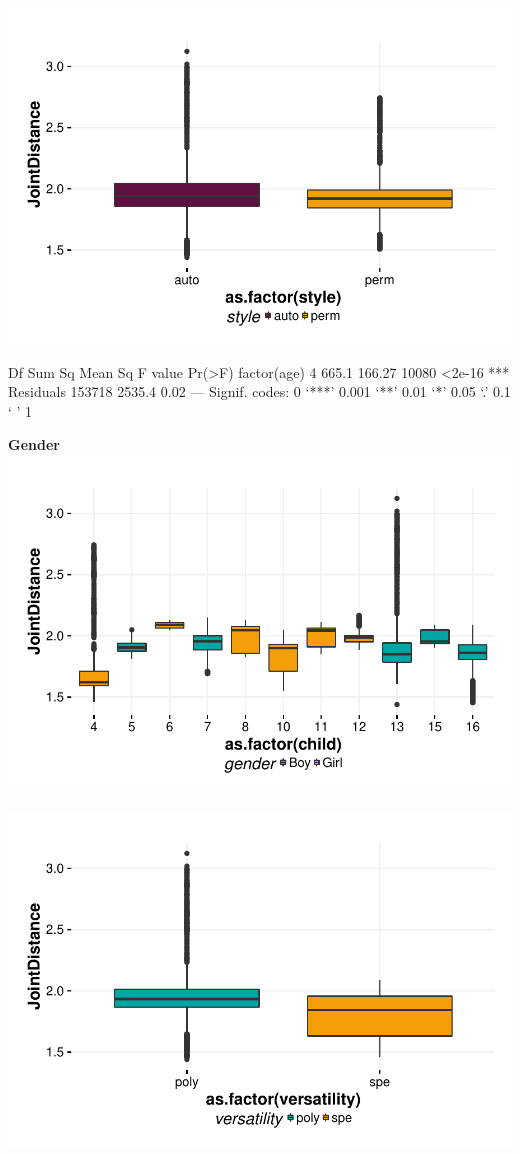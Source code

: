 \documentclass{article}
\begin{document}
\includegraphics{features-plot_distance_style_quiz}

\begin{Schunk}
\begin{Soutput}
                Df Sum Sq Mean Sq F value Pr(>F)    
factor(age)      4  665.1  166.27   10080 <2e-16 ***
Residuals   153718 2535.4    0.02                   
---
Signif. codes:  0 ‘***’ 0.001 ‘**’ 0.01 ‘*’ 0.05 ‘.’ 0.1 ‘ ’ 1
\end{Soutput}
\end{Schunk}

\textbf{Gender}
\includegraphics{features-plot_distance_child_gender_quiz}

\includegraphics{features-plot_distance_gender_quiz}
\end{document}
